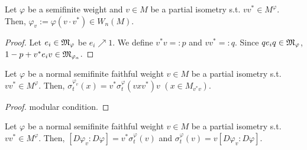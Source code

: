 \begin{proposition}
  Let $\varphi$ be a semifinite weight and $v \in M$ be a partial isometry s.t. $v v^* \in M^\varphi$.
  Then, $\varphi_v := \varphi(v \cdot v^*) \in W_n(M)$.
\end{proposition}

\begin{proof}
  Let $e_i \in \mathfrak{M}_\varphi$ be $e_i \nearrow 1$.
  We define $v^*v =:p$ and $vv^*=:q$.
  Since $qe_iq \in \mathfrak{M}_\varphi$, $1-p + v^*e_iv \in \mathfrak{M}_{\varphi_a}$.
\end{proof}

\begin{theorem}
  Let $\varphi$ be a normal semifinite faithful weight $v \in M$ be a partial isometry s.t. $vv^* \in M^\varphi$.
  Then, $\sigma_t^{\varphi_v} (x) = v^* \sigma_t^\varphi(vxv^*)v$ $(x \in M_{v^*v})$.
\end{theorem}

\begin{proof}
  modular condition.
\end{proof}

\begin{theorem}
  Let $\varphi$ be a normal semifinite faithful weight $v \in M$ be a partial isometry s.t. $vv^* \in M^\varphi$.
  Then, $[D\varphi_v:D\varphi]= v^*\sigma_t^\varphi(v)$ and $\sigma_t^\varphi(v) = v [D\varphi_v:D\varphi]$.
\end{theorem}

